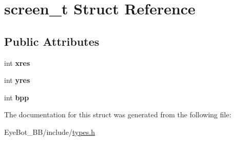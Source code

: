 \hypertarget{structscreen__t}{\section{screen\-\_\-t \-Struct \-Reference}
\label{structscreen__t}
}
\subsection*{\-Public \-Attributes}
\begin{DoxyCompactItemize}
\item 
\hypertarget{structscreen__t_a72a550004d0e55195983a82ddbb604a2}{int {\bfseries xres}}\label{structscreen__t_a72a550004d0e55195983a82ddbb604a2}

\item 
\hypertarget{structscreen__t_a88dd611eb79e4c53de1d3d414983fcfc}{int {\bfseries yres}}\label{structscreen__t_a88dd611eb79e4c53de1d3d414983fcfc}

\item 
\hypertarget{structscreen__t_a9293504b43e66961e29f65878571d9a3}{int {\bfseries bpp}}\label{structscreen__t_a9293504b43e66961e29f65878571d9a3}

\end{DoxyCompactItemize}


\-The documentation for this struct was generated from the following file\-:\begin{DoxyCompactItemize}
\item 
\-Eye\-Bot\-\_\-\-B\-B/include/\hyperlink{types_8h}{types.\-h}\end{DoxyCompactItemize}
